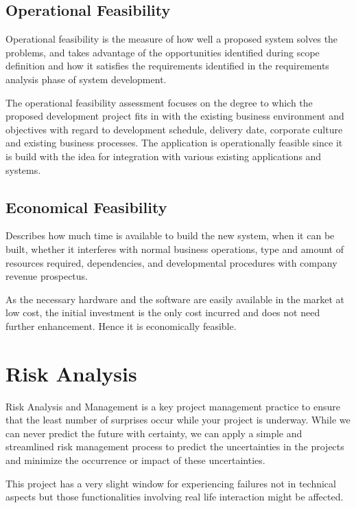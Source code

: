\subsection{Operational Feasibility}
Operational feasibility is the measure of how well a proposed system solves the problems, and takes advantage of the opportunities identified during scope definition and how it satisfies  the requirements identified in the requirements analysis phase of system development.

The operational feasibility assessment focuses on the degree to which the proposed development project fits in with the existing business environment and objectives with regard to development schedule, delivery date, corporate culture and existing business processes. The application is operationally feasible since it is build with the idea for integration with various existing applications and systems.


\subsection{Economical Feasibility}
Describes how much time is available to build the new system, when it can be built, whether it interferes with normal business operations, type and amount of resources required, dependencies, and developmental procedures with company revenue prospectus.

As the necessary hardware and the software are easily available in the market at low cost, the initial investment is the only cost incurred and does not need further enhancement. Hence it is economically feasible.


\section{Risk Analysis}
Risk Analysis and Management is a key project management practice to ensure that the least number of surprises occur while your project is underway. While we can never predict the future with certainty, we can apply a simple and streamlined risk management process to predict the uncertainties in the projects and minimize the occurrence or impact of these uncertainties.

This project has a very slight window for experiencing failures not in technical aspects but those functionalities involving real life interaction might be affected. 


